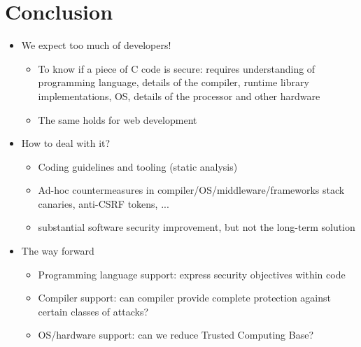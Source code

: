 \documentclass[12pt,titlepage,a4paper]{report}
\begin{document}
	\chapter{Conclusion}
		\begin{itemize}
			\item We expect too much of developers!
			\begin{itemize}
				\item To know if a piece of C code is secure: requires understanding of programming language, details of the compiler, runtime library implementations, OS, details of the processor and other hardware
				\item The same holds for web development
			\end{itemize}
			\item How to deal with it?
			\begin{itemize}
				\item Coding guidelines and tooling (static analysis)
				\item Ad-hoc countermeasures in compiler/OS/middleware/frameworks
					\subitem stack canaries, anti-CSRF tokens, ...
				\item[\textrightarrow] substantial software security improvement, but not the long-term solution
			\end{itemize}
			\item The way forward
			\begin{itemize}
				\item Programming language support: express security objectives within code
				\item Compiler support: can compiler provide complete protection against certain classes of attacks?
				\item OS/hardware support: can we reduce Trusted Computing Base?
			\end{itemize}
		\end{itemize}
\end{document}
